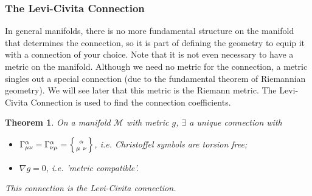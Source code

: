 \documentclass[a4paper]{article}
\theoremstyle{new}
\newtheorem{thm}{Theorem}[section]
\begin{document}
\subsubsection{The Levi-Civita Connection}
In general manifolds, there is no more fundamental structure on the manifold that determines the connection, so it is part of defining the geometry to equip it with a connection of your choice. Note that it is not even necessary to have a metric on the manifold. Although we need no metric for the connection, a metric singles out a special connection (due to the fundamental theorem of Riemannian geometry). We will see later that this metric is the Riemann metric. The Levi-Civita Connection is used to find the connection coefficients.
\begin{thm}
On a manifold $\mathcal{M}$ with metric $g$, $\exists$ a unique connection with
\begin{itemize}
    \item $\Gamma_{\mu\nu}^\alpha=\Gamma_{\nu\mu}^\alpha=\left \{ {\alpha \atop
\mu\ \nu}\right \}$, i.e. Christoffel symbols are torsion free;
    \item $\nabla g=0$, i.e. 'metric compatible'.
\end{itemize}
This connection is the Levi-Civita connection.
\end{thm}
\end{document}
